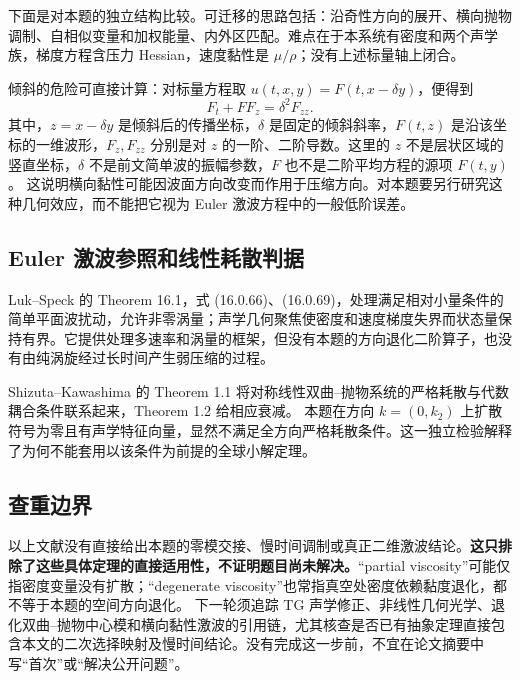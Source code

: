 下面是对本题的独立结构比较。可迁移的思路包括：沿奇性方向的展开、横向抛物调制、自相似变量和加权能量、内外区匹配。难点在于本系统有密度和两个声学族，梯度方程含压力 Hessian，速度黏性是 $\mu/\rho$；没有上述标量轴上闭合。

倾斜的危险可直接计算：对标量方程取 $u(t,x,y)=F(t,x-\delta y)$，便得到
\[
 F_t+FF_z=\delta^2F_{zz}.
\]
其中，$z=x-\delta y$ 是倾斜后的传播坐标，$\delta$ 是固定的倾斜斜率，$F(t,z)$ 是沿该坐标的一维波形，$F_z,F_{zz}$ 分别是对 $z$ 的一阶、二阶导数。这里的 $z$ 不是层状区域的竖直坐标，$\delta$ 不是前文简单波的振幅参数，$F$ 也不是二阶平均方程的源项 $F(t,y)$。
这说明横向黏性可能因波面方向改变而作用于压缩方向。对本题要另行研究这种几何效应，而不能把它视为 Euler 激波方程中的一般低阶误差。

\subsection{Euler 激波参照和线性耗散判据}
Luk--Speck 的 Theorem 16.1，式 (16.0.66)、(16.0.69)，处理满足相对小量条件的简单平面波扰动，允许非零涡量；声学几何聚焦使密度和速度梯度失界而状态量保持有界。它提供处理多速率和涡量的框架，但没有本题的方向退化二阶算子，也没有由纯涡旋经过长时间产生弱压缩的过程。\cite{LS}

Shizuta--Kawashima 的 Theorem 1.1 将对称线性双曲--抛物系统的严格耗散与代数耦合条件联系起来，Theorem 1.2 给相应衰减。\cite{SK}
本题在方向 $k=(0,k_2)$ 上扩散符号为零且有声学特征向量，显然不满足全方向严格耗散条件。这一独立检验解释了为何不能套用以该条件为前提的全球小解定理。

\subsection{查重边界}
以上文献没有直接给出本题的零模交接、慢时间调制或真正二维激波结论。\textbf{这只排除了这些具体定理的直接适用性，不证明题目尚未解决。}“partial viscosity”可能仅指密度变量没有扩散；“degenerate viscosity”也常指真空处密度依赖黏度退化，都不等于本题的空间方向退化。
下一轮须追踪 TG 声学修正、非线性几何光学、退化双曲--抛物中心模和横向黏性激波的引用链，尤其核查是否已有抽象定理直接包含本文的二次选择映射及慢时间结论。没有完成这一步前，不宜在论文摘要中写“首次”或“解决公开问题”。
